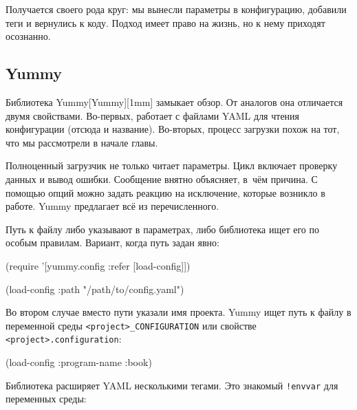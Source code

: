 Получается своего рода круг: мы вынесли параметры в конфигурацию, добавили теги
и вернулись к коду. Подход имеет право на жизнь, но к нему приходят осознанно.

\subsection{Yummy}


Библиотека Yummy[Yummy][1mm] замыкает обзор. От
аналогов она отличается двумя свойствами. Во-первых, работает с файлами YAML для
чтения конфигурации (отсюда и название). Во-вторых, процесс загрузки похож на
тот, что мы рассмотрели в начале главы.

Полноценный загрузчик не только читает параметры. Цикл включает проверку данных
и вывод ошибки. Сообщение внятно объясняет, в~чём причина. С помощью опций можно
задать реакцию на исключение, которые возникло в работе. Yummy предлагает всё из
перечисленного.

Путь к файлу либо указывают в параметрах, либо библиотека ищет его по особым
правилам. Вариант, когда путь задан явно:

\begin{english}
  \begin{clojure}
(require '[yummy.config :refer [load-config]])

(load-config {:path "/path/to/config.yaml"})
  \end{clojure}
\end{english}

Во втором случае вместо пути указали имя проекта. Yummy ищет путь к файлу в
переменной среды \verb|<project>_CONFIGURATION| или свойстве
\verb|<project>.configuration|:

\begin{english}
\end{english}

\begin{english}
  \begin{clojure}
(load-config {:program-name :book})
  \end{clojure}
\end{english}

Библиотека расширяет YAML несколькими тегами. Это знакомый \verb|!envvar|
для переменных среды:

